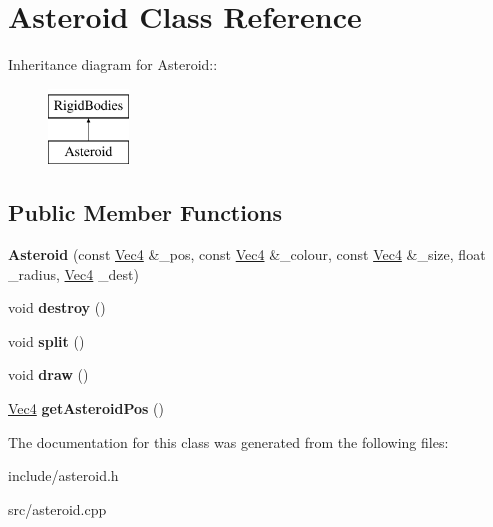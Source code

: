 \hypertarget{classAsteroid}{
\section{Asteroid Class Reference}
\label{classAsteroid}
}
Inheritance diagram for Asteroid::\begin{figure}[H]
\begin{center}
\leavevmode
\includegraphics[height=2cm]{classAsteroid}
\end{center}
\end{figure}
\subsection*{Public Member Functions}
\begin{DoxyCompactItemize}
\item 
\hypertarget{classAsteroid_aab671c63e11216e8f933b02ab3e5a5ed}{
{\bfseries Asteroid} (const \hyperlink{classVec4}{Vec4} \&\_\-pos, const \hyperlink{classVec4}{Vec4} \&\_\-colour, const \hyperlink{classVec4}{Vec4} \&\_\-size, float \_\-radius, \hyperlink{classVec4}{Vec4} \_\-dest)}
\label{classAsteroid_aab671c63e11216e8f933b02ab3e5a5ed}

\item 
\hypertarget{classAsteroid_a373e8bf80c1ee852f2452b3aec3b4f66}{
void {\bfseries destroy} ()}
\label{classAsteroid_a373e8bf80c1ee852f2452b3aec3b4f66}

\item 
\hypertarget{classAsteroid_a46dddcabfbc1ddde37d914aca02ef0e3}{
void {\bfseries split} ()}
\label{classAsteroid_a46dddcabfbc1ddde37d914aca02ef0e3}

\item 
\hypertarget{classAsteroid_a88c63131f8f8e1a37d2245c33d585042}{
void {\bfseries draw} ()}
\label{classAsteroid_a88c63131f8f8e1a37d2245c33d585042}

\item 
\hypertarget{classAsteroid_a960445f95bdbcf12c9974158658528b2}{
\hyperlink{classVec4}{Vec4} {\bfseries getAsteroidPos} ()}
\label{classAsteroid_a960445f95bdbcf12c9974158658528b2}

\end{DoxyCompactItemize}


The documentation for this class was generated from the following files:\begin{DoxyCompactItemize}
\item 
include/asteroid.h\item 
src/asteroid.cpp\end{DoxyCompactItemize}
